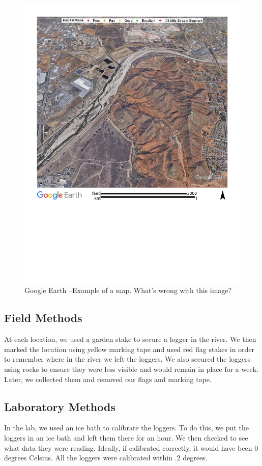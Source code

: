 \documentclass{article}
\begin{document}
\begin{figure}
\includegraphics[width=1.00\textwidth]{Figures/SantaAna_SatelliteImage}
\caption{Google Earth --Example of a map. What's wrong with this image?}
\label{SAR_Image}
\end{figure}

\subsection{Field Methods} 
At each location, we used a garden stake to secure a logger in the river. We then marked the location using yellow marking tape and used red flag stakes in order to remember where in the river we left the loggers. We also secured the loggers using rocks to ensure they were less visible and would remain in place for a week. Later, we collected them and removed our flags and marking tape. 

\subsection{Laboratory Methods}
In the lab, we used an ice bath to calibrate the loggers. To do this, we put the loggers in an ice bath and left them there for an hour. We then checked to see what data they were reading. Ideally, if calibrated correctly, it would have been 0 degrees Celsius. All the loggers were calibrated within .2 degrees.
\end{document}
